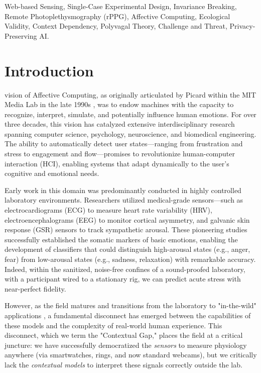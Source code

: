 \documentclass[journal]{IEEEtran}
\begin{document}
\begin{IEEEkeywords}
Web-based Sensing, Single-Case Experimental Design, Invariance Breaking, Remote Photoplethysmography (rPPG), 
Affective Computing, Ecological Validity, Context Dependency, Polyvagal Theory, Challenge and Threat, Privacy-Preserving AI.
\end{IEEEkeywords}

\section{Introduction}

 vision of Affective Computing, as originally articulated by Picard within the MIT Media Lab in the late 1990s \cite{picard_affective_computing}, 
was to endow machines with the capacity to recognize, interpret, simulate, and potentially influence human emotions. 
For over three decades, this vision has catalyzed extensive interdisciplinary research spanning computer science, psychology, 
neuroscience, and biomedical engineering. The ability to automatically detect user states—ranging from frustration and stress 
to engagement and flow—promises to revolutionize human-computer interaction (HCI), enabling systems that adapt dynamically 
to the user's cognitive and emotional needs.

Early work in this domain was predominantly conducted in highly controlled laboratory environments. 
Researchers utilized medical-grade sensors—such as electrocardiograms (ECG) to measure heart rate variability (HRV), 
electroencephalograms (EEG) to monitor cortical asymmetry, and galvanic skin response (GSR) sensors to track sympathetic arousal. 
These pioneering studies successfully established the somatic markers of basic emotions, enabling the development of classifiers 
that could distinguish high-arousal states (e.g., anger, fear) from low-arousal states (e.g., sadness, relaxation) with remarkable accuracy. 
Indeed, within the sanitized, noise-free confines of a sound-proofed laboratory, with a participant wired to a stationary rig, 
we can predict acute stress with near-perfect fidelity.

However, as the field matures and transitions from the laboratory to "in-the-wild" applications \cite{ambulatory_assessment}, 
a fundamental disconnect has emerged between the capabilities of these models and the complexity of real-world human experience. 
This disconnect, which we term the "Contextual Gap," places the field at a critical juncture: we have successfully democratized 
the \textit{sensors} to measure physiology anywhere (via smartwatches, rings, and now standard webcams), 
but we critically lack the \textit{contextual models} to interpret these signals correctly outside the lab.
\end{document}
